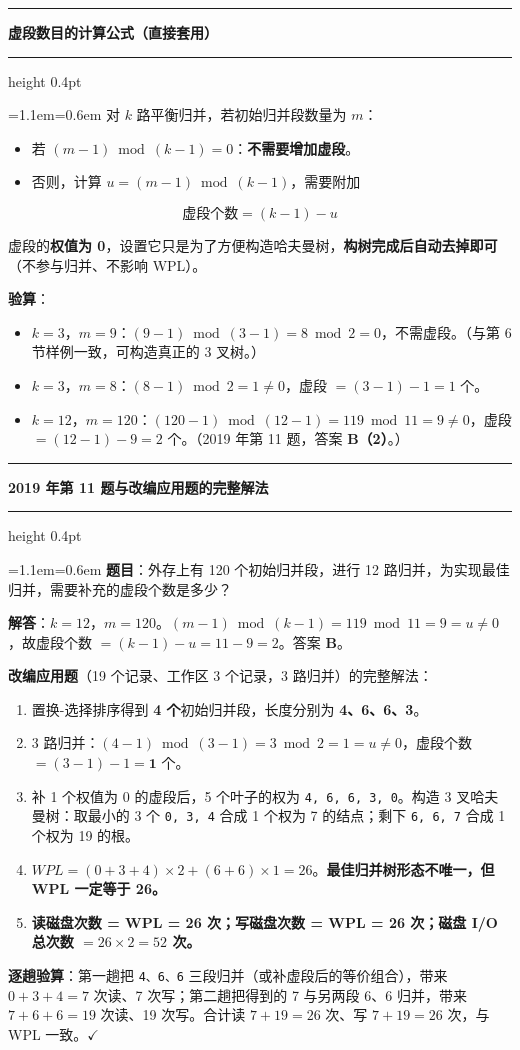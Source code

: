 \documentclass[11pt,openany,UTF8]{ctexbook}
\newcommand{\callouthead}[2]{%
  \par\addvspace{7pt}\noindent
  {\color{#1}\rule[-0.15em]{3pt}{1.05em}}\hspace{0.5em}%
  {\bfseries\color{#1}#2}\par\nobreak\vspace{-0.35em}%
  {\color{rulesep}\hrule height 0.4pt}\nobreak\vspace{0.45em}%
  \begingroup\small\setlength{\parindent}{0pt}%
  \leftskip=1.1em\rightskip=0.6em\noindent\ignorespaces}
\newcommand{\calloutend}{\par\endgroup\addvspace{7pt}}
\newenvironment{callkey}[1]{\callouthead{keybar}{#1}}{\calloutend}
\newenvironment{callexam}[1]{\callouthead{exambar}{#1}}{\calloutend}
\begin{document}
\begin{callkey}{虚段数目的计算公式（直接套用）}
对 $k$ 路平衡归并，若初始归并段数量为 $m$：

\begin{itemize}
\item 若 $(m-1)\bmod(k-1)=0$：\textbf{不需要增加虚段}。
\item 否则，计算 $u=(m-1)\bmod(k-1)$，需要附加
\end{itemize}
\[\text{虚段个数}=(k-1)-u\]

虚段的\textbf{权值为 0}，设置它只是为了方便构造哈夫曼树，\textbf{构树完成后自动去掉即可}（不参与归并、不影响 WPL）。

\end{callkey}

\textbf{验算}：

\begin{itemize}
\item $k=3$，$m=9$：$(9-1)\bmod(3-1)=8\bmod 2=0$，不需虚段。（与第 6 节样例一致，可构造真正的 3 叉树。）
\item $k=3$，$m=8$：$(8-1)\bmod 2=1\ne 0$，虚段 $=(3-1)-1=1$ 个。
\item $k=12$，$m=120$：$(120-1)\bmod(12-1)=119\bmod 11=9\ne 0$，虚段 $=(12-1)-9=2$ 个。（2019 年第 11 题，答案 \textbf{B（2）}。）
\end{itemize}
\begin{callexam}{2019 年第 11 题与改编应用题的完整解法}
\textbf{题目}：外存上有 120 个初始归并段，进行 12 路归并，为实现最佳归并，需要补充的虚段个数是多少？

\textbf{解答}：$k=12$，$m=120$。$(m-1)\bmod(k-1)=119\bmod 11=9=u\ne0$，故虚段个数 $=(k-1)-u=11-9=2$。答案 \textbf{B}。

\textbf{改编应用题}（19 个记录、工作区 3 个记录，3 路归并）的完整解法：

\begin{enumerate}
\item 置换-选择排序得到 \textbf{4 个}初始归并段，长度分别为 \textbf{4、6、6、3}。
\item 3 路归并：$(4-1)\bmod(3-1)=3\bmod 2=1=u\ne0$，虚段个数 $=(3-1)-1=\mathbf{1}$ 个。
\item 补 1 个权值为 0 的虚段后，5 个叶子的权为 \texttt{4,\allowbreak{} 6,\allowbreak{} 6,\allowbreak{} 3,\allowbreak{} 0}。构造 3 叉哈夫曼树：取最小的 3 个 \texttt{0,\allowbreak{} 3,\allowbreak{} 4} 合成 1 个权为 7 的结点；剩下 \texttt{6,\allowbreak{} 6,\allowbreak{} 7} 合成 1 个权为 19 的根。
\item $WPL=(0+3+4)\times2+(6+6)\times1=26$。\textbf{最佳归并树形态不唯一，但 WPL 一定等于 26。}
\item \textbf{读磁盘次数 = WPL = 26 次；写磁盘次数 = WPL = 26 次；磁盘 I/O 总次数 $=26\times2=52$ 次。}
\end{enumerate}
\textbf{逐趟验算}：第一趟把 \texttt{4、6、6} 三段归并（或补虚段后的等价组合），带来 $0+3+4=7$ 次读、7 次写；第二趟把得到的 7 与另两段 6、6 归并，带来 $7+6+6=19$ 次读、19 次写。合计读 $7+19=26$ 次、写 $7+19=26$ 次，与 WPL 一致。$\checkmark$

\end{callexam}
\end{document}
